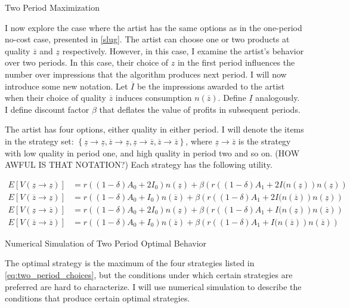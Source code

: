 \documentclass[
]{article}
\begin{document}
Two Period Maximization

I now explore the case where the artist has the same options as in the
one-period no-cost case, presented in \ref{slug}. The artist can choose
one or two products at quality \(\overline z\) and \(\underline z\)
respectively. However, in this case, I examine the artist's behavior
over two periods. In this case, their choice of \(z\) in the first
period influences the number over impressions that the algorithm
produces next period. I will now introduce some new notation. Let
\(\overline {I}\) be the impressions awarded to the artist when their
choice of quality \(\overline z\) induces consumption
\(n(\overline z)\). Define \(\underline I\) analogously. I define
discount factor \(\beta\) that deflates the value of profits in
subsequent periods.

The artist has four options, either quality in either period. I will
denote the items in the strategy set:
\(\left\{\underline z\to\underline z,\overline z\to\underline z,\underline z\to\overline z,\overline z\to\overline z\right\}\),
where \(\underline z\to \overline{z}\) is the strategy with low quality
in period one, and high quality in period two and so on. (HOW AWFUL IS
THAT NOTATION?) Each strategy has the following utility.

\begin{equation} \label{eq:two_period_choices}
\begin{aligned} 
E[V(\underline z\to\underline z)]&=r\left((1-\delta)A_{0}+2I_0\right)n(\underline{z})+\beta\left(r\left((1-\delta)A_{1}+2I(n(\underline{z})\right)n(\underline{z})\right)\\
E[V(\overline z\to\underline z)]&=r\left((1-\delta)A_{0}+I_0\right)n(\overline{z})+\beta\left(r\left((1-\delta)A_{1}+2I(n(\overline{z})\right)n(\underline{z})\right)\\
E[V(\underline z\to\overline z)]&=r\left((1-\delta)A_{0}+2I_0\right)n(\underline{z})+\beta\left(r\left((1-\delta)A_{1}+I(n(\underline{z})\right)n(\overline{z})\right)\\
E[V(\overline z\to\overline z)]&=r\left((1-\delta)A_{0}+I_0\right)n(\overline{z})+\beta\left(r\left((1-\delta)A_{1}+I(n(\overline{z})\right)n(\overline{z})\right)
\end{aligned}
\end{equation}

Numerical Simulation of Two Period Optimal Behavior

The optimal strategy is the maximum of the four strategies listed in
\ref{eq:two_period_choices}, but the conditions under which certain
strategies are preferred are hard to characterize. I will use numerical
simulation to describe the conditions that produce certain optimal
strategies.
\end{document}
